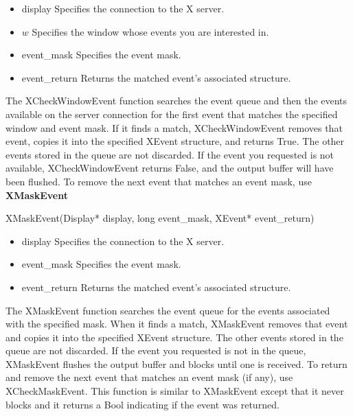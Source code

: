 \documentclass{report}
\begin{document}
\begin{itemize}
            \begin{itemize}
                \item display Specifies the connection to the X server.
                \item $w$ Specifies the window whose events you are interested in.
                \item event\_mask Specifies the event mask.
                \item event\_return Returns the matched event’s associated structure.
            \end{itemize}
            The XCheckWindowEvent function searches the event queue and then the events available on the server connection for the first event that matches the specified window and event mask. If it finds a match, XCheckWindowEvent removes that event, copies it into the specified XEvent structure, and returns True. The other events stored in the queue are not discarded. If the event you requested is not available, XCheckWindowEvent returns False, and the output buffer will have been flushed.
            \bigbreak \noindent 
            To remove the next event that matches an event mask, use \textbf{XMaskEvent}
            \bigbreak \noindent 
            \begin{cppcode}
            XMaskEvent(Display* display, long event_mask, XEvent* event_return)
            \end{cppcode}
            \begin{itemize}
                \item display Specifies the connection to the X server.
                \item event_mask Specifies the event mask.
                \item event_return Returns the matched event’s associated structure.
            \end{itemize}
            The XMaskEvent function searches the event queue for the events associated with the specified mask. When it finds a match, XMaskEvent removes that event and copies it into the specified XEvent structure. The other events stored in the queue are not discarded. If the event you requested is not in the queue, XMaskEvent flushes the output buffer and blocks until one is received.
            \bigbreak \noindent 
            To return and remove the next event that matches an event mask (if any), use XCheckMaskEvent. This function is similar to XMaskEvent except that it never blocks and it returns a Bool indicating if the event was returned.
            \bigbreak \noindent 

\end{itemize}
\end{document}
